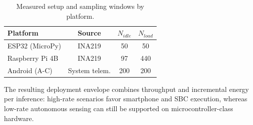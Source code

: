 \begin{table}[t]
\caption{Measured setup and sampling windows by platform.}
\label{tab:energy_setup}
\centering
\footnotesize
\setlength{\tabcolsep}{4pt}
\begin{tabular}{lccc}
\toprule
Platform & Source & $N_{idle}$ & $N_{load}$ \\
\midrule
ESP32 (MicroPy) & INA219 & 50 & 50 \\
Raspberry Pi 4B & INA219 & 97 & 440 \\
Android (A-C) & System telem. & 200 & 200 \\
\bottomrule
\end{tabular}
\end{table}


The resulting deployment envelope combines throughput and incremental energy per inference: high-rate scenarios favor smartphone and SBC execution, whereas low-rate autonomous sensing can still be supported on microcontroller-class hardware.
